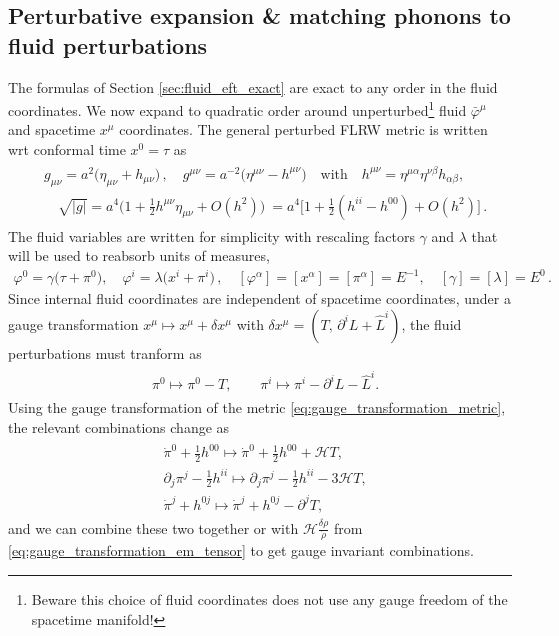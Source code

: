 \subsection{Perturbative expansion \& matching phonons to fluid perturbations}
%
The formulas of Section \ref{sec:fluid_eft_exact} are exact to any order in the fluid coordinates.
We now expand to quadratic order around unperturbed\footnote{Beware this choice of fluid coordinates does not use any gauge freedom of the spacetime manifold!} fluid $\bar{\varphi}^\mu$ and spacetime $x^\mu$ coordinates.
The general perturbed FLRW metric is written wrt conformal time $x^0=\tau$ as
{\small \begin{align}\label{eq:general_perturbed_FLRW_metric}
\begin{aligned}
    &g_{\mu\nu}=a^2\Big(\eta_{\mu\nu}+h_{\mu\nu}\Big)\,,\quad g^{\mu\nu}=a^{-2}\Big(\eta^{\mu\nu}-h^{\mu\nu}\Big)\quad \text{with} \quad h^{\mu\nu}=\eta^{\mu\alpha}\eta^{\nu\beta}h_{\alpha\beta},\\
    &\quad \sqrt{|g|}= a^4\big(1+\tfrac12 h^{\mu\nu}\eta_{\mu\nu} +O(h^2)\big)\ = a^4\Big[1+\tfrac12 (h^{ii}-h^{00}) +O(h^2)\Big]\,.
\end{aligned}
\end{align}}
The fluid variables are written for simplicity with rescaling factors $\gamma$ and $\lambda$ that will be used to reabsorb units of measures,
{\small\begin{align}\label{eq:perturbed_fluid_coordinates}
    \varphi^0=\gamma\Big(\tau+\pi^0\Big), \quad \varphi^i=\lambda\Big(x^i+\pi^i\Big)\,, \quad [\varphi^\alpha]=[x^\alpha]=[\pi^\alpha]=E^{-1},\quad [\gamma]=[\lambda]=E^0\,.
\end{align}}
Since internal fluid coordinates are independent of spacetime coordinates, under a gauge transformation $x^\mu \mapsto x^\mu +\delta x^\mu$ with $\delta x^\mu=(T,\,\partial^i L+\hat{L}^i)$, the fluid perturbations must tranform as
{\small\begin{align}\label{eq:gauge_transformation_fluid_perturbations}
\begin{aligned}
    &\pi^0 \mapsto \pi^0 - T,\qquad \pi^i \mapsto \pi^i - \partial^i L - \hat{L}^i.
\end{aligned}\end{align}}
Using the gauge transformation of the metric \eqref{eq:gauge_transformation_metric}, the relevant combinations change as
{\small
\begin{align}\label{eq:gauge_transformation_fluid_and_metric_combinations}
\begin{aligned}
    &\dot{\pi}^0+\tfrac12 h^{00} \mapsto \dot{\pi}^0+\tfrac12 h^{00} +\mathcal{H} T, \\
    &\partial_j\pi^j -\tfrac12 h^{ii} \mapsto \partial_j\pi^j -\tfrac12 h^{ii} -3\mathcal{H} T, \\
    &\dot{\pi}^j+h^{0j} \mapsto \dot{\pi}^j+h^{0j} -\partial^j T,
\end{aligned}\end{align}}
and we can combine these two together or with $\mathcal{H}\frac{\delta \rho}{\dot{\rho}}$ from \eqref{eq:gauge_transformation_em_tensor} to get gauge invariant combinations.

